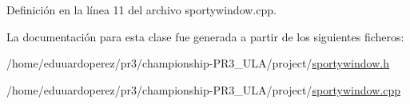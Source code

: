 Definición en la línea 11 del archivo sportywindow.\+cpp.



La documentación para esta clase fue generada a partir de los siguientes ficheros\+:\begin{DoxyCompactItemize}
\item 
/home/eduuardoperez/pr3/championship-\/\+P\+R3\+\_\+\+U\+L\+A/project/\hyperlink{sportywindow_8h}{sportywindow.\+h}\item 
/home/eduuardoperez/pr3/championship-\/\+P\+R3\+\_\+\+U\+L\+A/project/\hyperlink{sportywindow_8cpp}{sportywindow.\+cpp}\end{DoxyCompactItemize}

